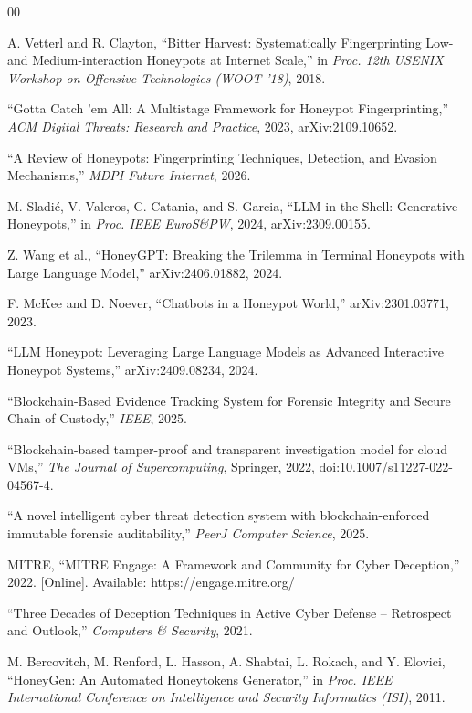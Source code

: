 \documentclass[conference]{IEEEtran}
\begin{document}
\begin{thebibliography}{00}

 A. Vetterl and R. Clayton, ``Bitter Harvest: Systematically Fingerprinting Low- and Medium-interaction Honeypots at Internet Scale,'' in \emph{Proc. 12th USENIX Workshop on Offensive Technologies (WOOT '18)}, 2018.

 ``Gotta Catch 'em All: A Multistage Framework for Honeypot Fingerprinting,'' \emph{ACM Digital Threats: Research and Practice}, 2023, arXiv:2109.10652.

 ``A Review of Honeypots: Fingerprinting Techniques, Detection, and Evasion Mechanisms,'' \emph{MDPI Future Internet}, 2026.

 M. Sladi\'{c}, V. Valeros, C. Catania, and S. Garcia, ``LLM in the Shell: Generative Honeypots,'' in \emph{Proc. IEEE EuroS\&PW}, 2024, arXiv:2309.00155.

 Z. Wang et al., ``HoneyGPT: Breaking the Trilemma in Terminal Honeypots with Large Language Model,'' arXiv:2406.01882, 2024.

 F. McKee and D. Noever, ``Chatbots in a Honeypot World,'' arXiv:2301.03771, 2023.

 ``LLM Honeypot: Leveraging Large Language Models as Advanced Interactive Honeypot Systems,'' arXiv:2409.08234, 2024.

 ``Blockchain-Based Evidence Tracking System for Forensic Integrity and Secure Chain of Custody,'' \emph{IEEE}, 2025.

 ``Blockchain-based tamper-proof and transparent investigation model for cloud VMs,'' \emph{The Journal of Supercomputing}, Springer, 2022, doi:10.1007/s11227-022-04567-4.

 ``A novel intelligent cyber threat detection system with blockchain-enforced immutable forensic auditability,'' \emph{PeerJ Computer Science}, 2025.

 MITRE, ``MITRE Engage: A Framework and Community for Cyber Deception,'' 2022. [Online]. Available: https://engage.mitre.org/

 ``Three Decades of Deception Techniques in Active Cyber Defense -- Retrospect and Outlook,'' \emph{Computers \& Security}, 2021.

 M. Bercovitch, M. Renford, L. Hasson, A. Shabtai, L. Rokach, and Y. Elovici, ``HoneyGen: An Automated Honeytokens Generator,'' in \emph{Proc. IEEE International Conference on Intelligence and Security Informatics (ISI)}, 2011.


\end{thebibliography}
\end{document}

